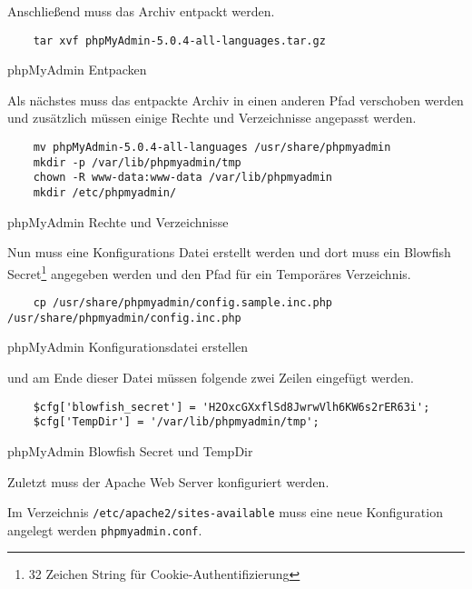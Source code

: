 Anschließend muss das Archiv entpackt werden.

\begin{listing}[H]
  \begin{verbatim}
    tar xvf phpMyAdmin-5.0.4-all-languages.tar.gz
  \end{verbatim}
  \caption{phpMyAdmin Entpacken}
\end{listing}

Als nächstes muss das entpackte Archiv in einen anderen Pfad verschoben werden
und zusätzlich müssen einige Rechte und Verzeichnisse angepasst werden.

\begin{listing}[H]
  \begin{verbatim}
    mv phpMyAdmin-5.0.4-all-languages /usr/share/phpmyadmin
    mkdir -p /var/lib/phpmyadmin/tmp
    chown -R www-data:www-data /var/lib/phpmyadmin
    mkdir /etc/phpmyadmin/
  \end{verbatim}
  \caption{phpMyAdmin Rechte und Verzeichnisse}
\end{listing}

Nun muss eine Konfigurations Datei erstellt werden und dort muss ein Blowfish
Secret\footnote{32 Zeichen String für Cookie-Authentifizierung} angegeben werden und den Pfad für ein Temporäres Verzeichnis.

\begin{listing}[H]
  \begin{verbatim}
    cp /usr/share/phpmyadmin/config.sample.inc.php /usr/share/phpmyadmin/config.inc.php
  \end{verbatim}
  \caption{phpMyAdmin Konfigurationsdatei erstellen}
\end{listing}

und am Ende dieser Datei müssen folgende zwei Zeilen eingefügt werden.

\begin{listing}[H]
  \begin{verbatim}
    $cfg['blowfish_secret'] = 'H2OxcGXxflSd8JwrwVlh6KW6s2rER63i'; 
    $cfg['TempDir'] = '/var/lib/phpmyadmin/tmp';
  \end{verbatim}
  \caption{phpMyAdmin Blowfish Secret und TempDir}
\end{listing}


Zuletzt muss der Apache Web Server konfiguriert werden.

Im Verzeichnis \verb|/etc/apache2/sites-available| muss eine neue
Konfiguration angelegt werden \verb|phpmyadmin.conf|.

